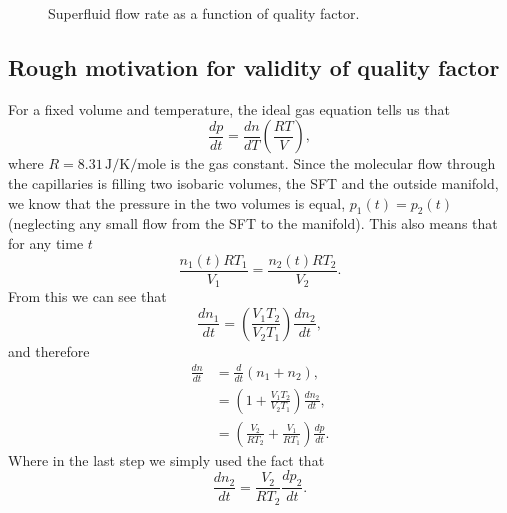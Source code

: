 \documentclass[
12pt, %
letterpaper, %
oneside, %
headinclude, footinclude, %
BCOR5mm, %
]{scrartcl}
\newcommand{\mrm}[1]{\mathrm{#1}}
\begin{document}
\begin{figure}[t]
\begin{center}
\end{center}
\caption[Superfluid flow rate as a function of quality factor.]{Superfluid flow rate as a function of quality factor.}
\label{fig:quality_factor}
\end{figure} 

\subsection{Rough motivation for validity of quality factor}
\label{sec:qmotivation}

For a fixed volume and temperature, the ideal gas equation tells us that 
\begin{equation}
\frac{dp}{dt} = \frac{dn}{dT} \left(\frac{RT}{V} \right),
\end{equation}
where $R = 8.31\,\mrm{J/K/mole}$ is the gas constant. Since the molecular flow through the capillaries is filling two isobaric volumes, the SFT and the outside manifold, we know that the pressure in the two volumes is equal, $p_1(t)=p_2(t)$ (neglecting any small flow from the SFT to the manifold). This also means that for any time $t$
\begin{equation}
\frac{n_1 (t) RT_1}{V_1} = \frac{n_2 (t) RT_2}{V_2}.
\end{equation}
From this we can see that 
\begin{equation}
\frac{d n_1}{dt} = \left( \frac{V_1T_2}{V_2T_1} \right) \frac{dn_2}{dt},
\end{equation}
and therefore
\begin{align}
\frac{d n}{dt} &= \frac{d}{dt}(n_1+n_2), \nonumber \\ 
&= \left( 1 + \frac{V_1T_2}{V_2T_1} \right) \frac{dn_2}{dt}, \nonumber \\
&= \left( \frac{V_2}{RT_2} + \frac{V_1}{RT_1} \right) \frac{dp}{dt}.
\label{eq:dndt}
\end{align}
Where in the last step we simply used the fact that
\begin{equation}
\frac{dn_2}{dt} = \frac{V_2}{RT_2} \frac{dp_2}{dt}.
\end{equation}
\end{document}
